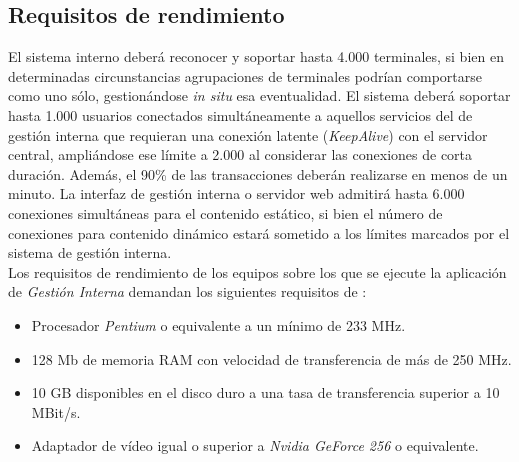\documentclass[11pt, a4paper, twoside, titlepage]{article}
\begin{document}
				

				

				

				
						
				

				

		\stopcontents[tocfunciones]

		\subsection{Requisitos de rendimiento}
			El sistema interno deberá reconocer y soportar hasta 4.000 terminales, si bien en determinadas circunstancias agrupaciones de terminales podrían comportarse como uno sólo, gestionándose \textit{in situ} esa eventualidad. El sistema deberá soportar hasta 1.000 usuarios conectados simultáneamente a aquellos servicios del \software de gestión interna que requieran una conexión latente (\textit{KeepAlive}) con el servidor central, ampliándose ese límite a 2.000 al considerar las conexiones de corta duración. Además, el 90\% de las transacciones deberán realizarse en menos de un minuto. La interfaz de gestión interna o servidor web admitirá hasta 6.000 conexiones simultáneas para el contenido estático, si bien el número de conexiones para contenido dinámico estará sometido a los límites marcados por el sistema de gestión interna.\\

			Los requisitos de rendimiento de los equipos sobre los que se ejecute la aplicación de \textit{Gestión Interna} demandan los siguientes requisitos de \hardware{}:
				\begin{itemize}
					\item Procesador \textit{Pentium} o equivalente a un mínimo de 233 MHz.
					\item 128 Mb de memoria RAM con velocidad de transferencia de más de 250 MHz.
					\item 10 GB disponibles en el disco duro a una tasa de transferencia superior a 10 MBit/s.
					\item Adaptador de vídeo igual o superior a \textit{Nvidia GeForce 256} o equivalente.
				\end{itemize}
\end{document}
